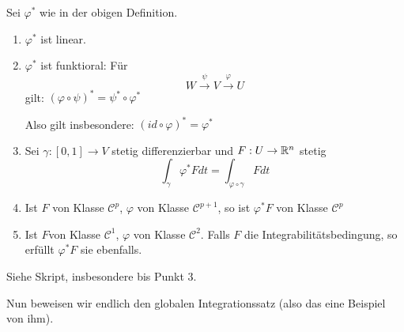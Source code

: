 \documentclass[main.tex]{subfiles}
\begin{document}
\begin{Theorem}
  Sei $\varphi^*$ wie in der obigen Definition.
  \begin{enumerate}
    \item $\varphi^*$ ist linear.
    \item $\varphi^*$ ist funktioral: Für
      $$W \stackrel{\psi}{\to} V \stackrel{\varphi}{\to} U$$
      gilt: $(\varphi \circ \psi)^* = \psi^* \circ \varphi^*$
      \begin{Bemerkung}
        Also gilt insbesondere: $(id \circ \varphi)^* = \varphi^*$
      \end{Bemerkung}
    \item Sei $\gamma: [0,1] \to V$ stetig differenzierbar und $F: U \to \mathbb{R}^n$ stetig
      $$\int_\gamma \varphi^* F dt = \int_{\varphi \circ \gamma} F dt$$
    \item Ist $F$ von Klasse $\mathcal{C}^p$, $\varphi$ von Klasse $\mathcal{C}^{p+1}$, so ist $\varphi^* F$ von Klasse $\mathcal{C}^p$
    \item Ist $F$von Klasse $\mathcal{C}^1$, $\varphi$ von Klasse $\mathcal{C}^2$. Falls $F$ die Integrabilitätsbedingung, so erfüllt $\varphi^* F$ sie ebenfalls.
  \end{enumerate}
\end{Theorem}

\begin{Beweis}
  Siehe Skript, insbesondere bis Punkt $3$.
\end{Beweis}

Nun beweisen wir endlich den globalen Integrationssatz (also das eine Beispiel von ihm).
\end{document}

